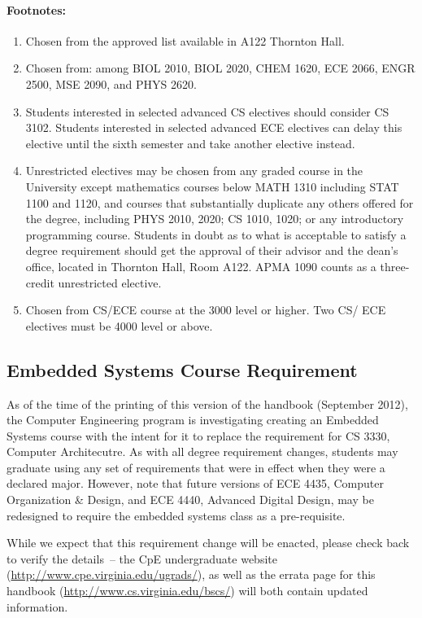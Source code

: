 \documentclass[10pt,letter]{book}
\newenvironment{numlist}{
\begin{enumerate}
\setlength{\itemsep}{0pt}
\setlength{\parskip}{0pt}}
{\end{enumerate}}
\begin{document}
\paragraph{Footnotes:}

\begin{numlist}
\item Chosen from the approved list available in A122 Thornton Hall.
\item Chosen from: among BIOL 2010, BIOL 2020, CHEM 1620, ECE 2066, ENGR
  2500, MSE 2090, and PHYS 2620.
\item Students interested in selected advanced CS electives should
  consider CS 3102.  Students interested in selected advanced ECE
  electives can delay this elective until the sixth semester and take
  another elective instead.
\item Unrestricted electives may be chosen from any graded course in
  the University except mathematics courses below MATH 1310 including
  STAT 1100 and 1120, and courses that substantially duplicate any
  others offered for the degree, including PHYS 2010, 2020; CS 1010,
  1020; or any introductory programming course. Students in doubt as
  to what is acceptable to satisfy a degree requirement should get the
  approval of their advisor and the dean's office, located in Thornton
  Hall, Room A122. APMA 1090 counts as a three-credit unrestricted
  elective.
\item Chosen from CS/ECE course at the 3000 level or higher. Two
  CS/ ECE electives must be 4000 level or above.
\end{numlist}

\subsection{Embedded Systems Course Requirement}
\label{embedded}

As of the time of the printing of this version of the handbook
(September 2012), the Computer Engineering program is investigating
creating an Embedded Systems course with the intent for it to replace
the requirement for CS 3330, Computer Architecutre.  As with all
degree requirement changes, students may graduate using any set of
requirements that were in effect when they were a declared major.
However, note that future versions of ECE 4435, Computer
Organization \& Design, and ECE 4440, Advanced Digital Design,
may be redesigned to require the embedded systems class as a
pre-requisite.

While we expect that this requirement change will be enacted, please
check back to verify the details~-- the CpE undergraduate website
(\url{http://www.cpe.virginia.edu/ugrads/}), as well as the errata
page for this handbook (\url{http://www.cs.virginia.edu/bscs/}) will
both contain updated information.
\end{document}
